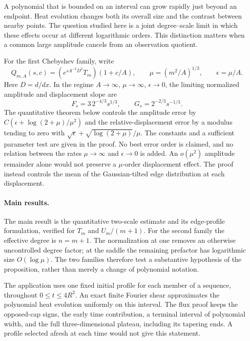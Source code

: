 \documentclass[11pt]{article}
\theoremstyle{definition}
\begin{document}
A polynomial that is bounded on an interval can grow rapidly just
beyond an endpoint. Heat evolution changes both its overall size and
the contrast between nearby points. The question studied here is a
joint degree--scale limit in which these effects occur at different
logarithmic orders. This distinction matters when a common large
amplitude cancels from an observation quotient.

For the first Chebyshev family, write
\[
 Q_{m,A}(s,c)=(e^{sA^{-2}D^2}T_m)(1+c/A),\qquad
 \mu=(m^2/A)^{1/3},\qquad \epsilon=\mu/A.
\]
Here $D=d/dx$. In the regime $A\to\infty$, $\mu\to\infty$,
$\epsilon\to0$, the
limiting normalized amplitude and displacement slope are
\[
 F_s=3\,2^{-4/3}s^{1/3},\qquad G_s=2^{-2/3}s^{-1/3}.
\]
The quantitative theorem below controls the amplitude error by
$C(\epsilon+\log(2+\mu)/\mu^2)$ and the relative-displacement
error by a modulus tending to zero with
$\sqrt\epsilon+\sqrt{\log(2+\mu)}/\mu$.
The constants and a sufficient parameter test are given in the proof.
No best error order is claimed, and no relation between the rates
$\mu\to\infty$ and $\epsilon\to0$ is added.
An $o(\mu^2)$ amplitude remainder alone would not preserve a
$\mu$-order displacement effect. The proof instead controls the
mean of the Gaussian-tilted edge distribution at each displacement.

\paragraph{Main results.}
The main result is the quantitative two-scale estimate and its
edge-profile formulation, verified for $T_m$ and $U_m/(m+1)$.
For the second family the effective degree is $n=m+1$.
The normalization at one removes an otherwise uncontrolled degree
factor; at the saddle the remaining prefactor has logarithmic size
$O(\log\mu)$. The two families therefore test a substantive hypothesis
of the proposition, rather than merely a change of polynomial notation.

The application uses one fixed initial profile for each member of a
sequence, throughout $0\le t\le4R^2$. An exact finite Fourier shear
approximates the polynomial heat evolution uniformly on this interval.
The flux proof keeps the opposed-cap signs, the early time contribution,
a terminal interval of polynomial width, and the full three-dimensional
plateau, including its tapering ends. A profile selected afresh at each
time would not give this statement.
\end{document}
